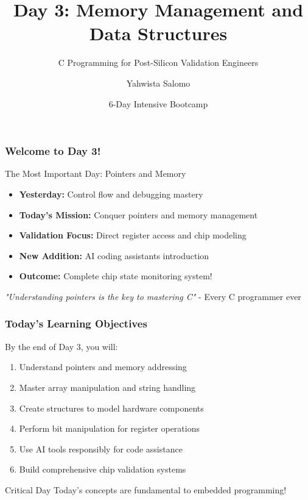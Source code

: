 \documentclass{beamer}
\title{Day 3: Memory Management and Data Structures}
\subtitle{C Programming for Post-Silicon Validation Engineers}
\author{Yahwista Salomo}
\date{6-Day Intensive Bootcamp}
\institute{Post-Silicon Validation Training Program}
\begin{document}
\frame{\titlepage}

\begin{frame}
\frametitle{Welcome to Day 3!}
\begin{center}
\Large The Most Important Day: Pointers and Memory
\end{center}

\begin{itemize}
    \item \textbf{Yesterday:} Control flow and debugging mastery
    \item \textbf{Today's Mission:} Conquer pointers and memory management
    \item \textbf{Validation Focus:} Direct register access and chip modeling
    \item \textbf{New Addition:} AI coding assistants introduction
    \item \textbf{Outcome:} Complete chip state monitoring system!
\end{itemize}

\vspace{0.5cm}
\begin{center}
\textit{"Understanding pointers is the key to mastering C"} - Every C programmer ever
\end{center}
\end{frame}

\begin{frame}
\frametitle{Today's Learning Objectives}
By the end of Day 3, you will:

\begin{enumerate}
    \item Understand pointers and memory addressing
    \item Master array manipulation and string handling
    \item Create structures to model hardware components
    \item Perform bit manipulation for register operations
    \item Use AI tools responsibly for code assistance
    \item Build comprehensive chip validation systems
\end{enumerate}

\vspace{0.5cm}
\begin{alertblock}{Critical Day}
Today's concepts are fundamental to embedded programming!
\end{alertblock}
\end{frame}
\end{document}
